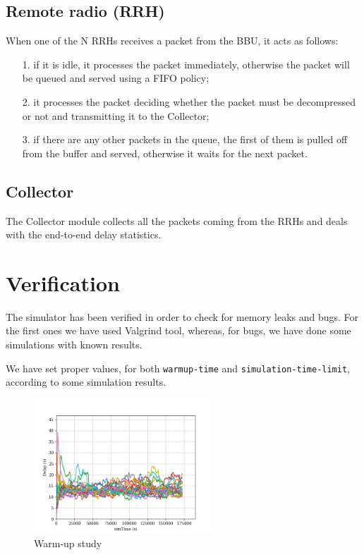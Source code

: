 \documentclass[11pt,a4paper,oneside, openright]{article}
\begin{document}
\subsection{Remote radio (RRH)}
When one of the N RRHs receives a packet from the BBU, it acts as follows:
\begin{itemize}
    \item[1.] if it is idle, it processes the packet immediately, otherwise the packet will be queued and served using a FIFO policy;
    \item[2.] it processes the packet deciding whether the packet must be decompressed or not and transmitting it to the Collector;
    \item[3.] if there are any other packets in the queue, the first of them is pulled off from the buffer and served, otherwise it waits for the next packet.
\end{itemize}


\subsection{Collector}
The Collector module collects all the packets coming from the RRHs and deals with the end-to-end delay statistics.

\section{Verification}
The simulator has been verified in order to check for memory leaks and bugs.
For the first ones we have used Valgrind tool, whereas, for bugs, we have done some simulations with known results.

We have set proper values, for both \texttt{warmup-time} and \texttt{simulation-time-limit}, according to some simulation results.
\begin{figure}[h]
	\centering
	\includegraphics[width=0.6\textwidth]{images/warm-up}
	\caption{Warm-up study}
	\label{fig:warm-up-study}
\end{figure}
\end{document}
